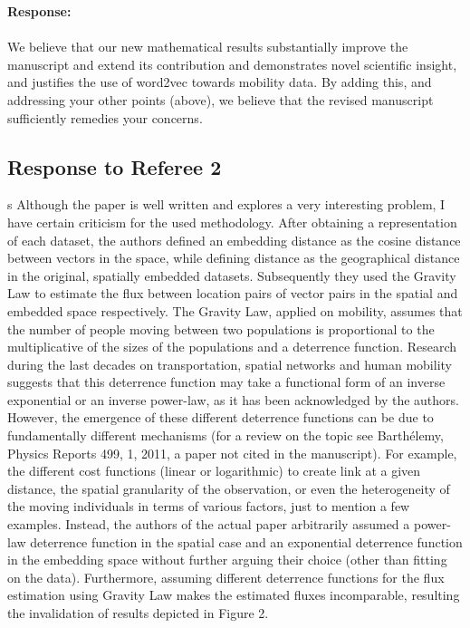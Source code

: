 \documentclass[12pt,a4paper]{article}
\newcommand{\response}[1]{{\noindent \textbf{Response:} \\ \\ \noindent #1}}
\newcommand{\rcomment}[1]{%
\vspace{10pt}
\begin{sectionbox}
s #1
\end{sectionbox}
}
\begin{document}
\response{We believe that our new mathematical results substantially improve the manuscript and extend its contribution and demonstrates novel scientific insight, and justifies the use of word2vec towards mobility data. By adding this, and addressing your other points (above), we believe that the revised manuscript sufficiently remedies your concerns.

}



%
%
\clearpage
\subsection{Response to Referee 2}

\rcomment{%
	Although the paper is well written and explores a very interesting problem, I have certain criticism for the used methodology. After obtaining a representation of each dataset, the authors defined an embedding distance as the cosine distance between vectors in the space, while defining distance as the geographical distance in the original, spatially embedded datasets. Subsequently they used the Gravity Law to estimate the flux between location pairs of vector pairs in the spatial and embedded space respectively. The Gravity Law, applied on mobility, assumes that the number of people moving between two populations is proportional to the multiplicative of the sizes of the populations and a deterrence function. Research during the last decades on transportation, spatial networks and human mobility suggests that this deterrence function may take a functional form of an inverse exponential or an inverse power-law, as it has been acknowledged by the authors. However, the emergence of these different deterrence functions can be due to fundamentally different mechanisms (for a review on the topic see Barthélemy, Physics Reports 499, 1, 2011, a paper not cited in the manuscript). For example, the different cost functions (linear or logarithmic) to create link at a given distance, the spatial granularity of the observation, or even the heterogeneity of the moving individuals in terms of various factors, just to mention a few examples. Instead, the authors of the actual paper arbitrarily assumed a power-law deterrence function in the spatial case and an exponential deterrence function in the embedding space without further arguing their choice (other than fitting on the data). Furthermore, assuming different deterrence functions for the flux estimation using Gravity Law makes the estimated fluxes incomparable, resulting the invalidation of results depicted in Figure 2.
}
\end{document}
